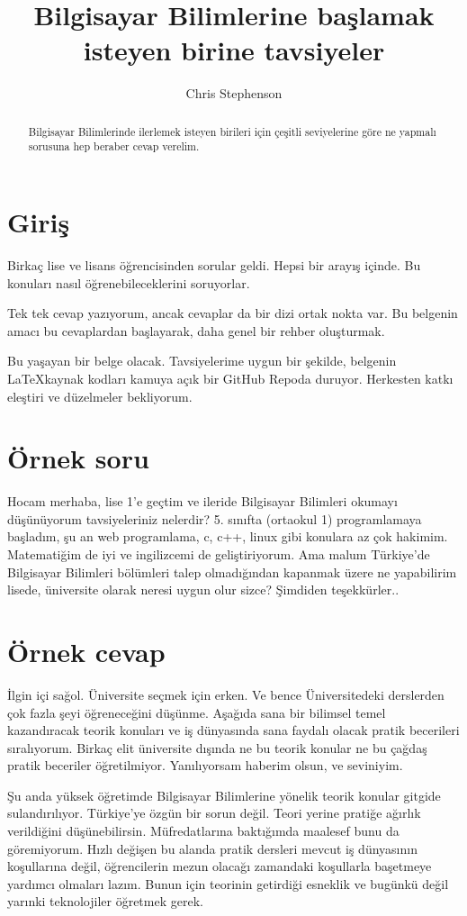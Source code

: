 \documentclass[a4paper,10pt]{article}
\title{Bilgisayar Bilimlerine başlamak isteyen birine tavsiyeler}
\author{Chris Stephenson}
\begin{document}
\maketitle

\begin{abstract}
Bilgisayar Bilimlerinde ilerlemek isteyen birileri için çeşitli seviyelerine göre ne yapmalı sorusuna hep beraber cevap verelim. 
\end{abstract}
\section*{Giriş}
Birkaç lise ve lisans öğrencisinden sorular geldi. Hepsi bir arayış içinde. Bu konuları nasıl öğrenebileceklerini soruyorlar.

Tek tek cevap yazıyorum, ancak cevaplar da bir dizi ortak nokta var. Bu belgenin amacı bu cevaplardan başlayarak, daha genel bir rehber oluşturmak.

Bu yaşayan bir belge olacak. Tavsiyelerime uygun bir şekilde, belgenin \LaTeX kaynak kodları kamuya açık bir GitHub Repoda duruyor. Herkesten katkı eleştiri ve düzelmeler bekliyorum.

\section*{Örnek soru}

Hocam merhaba, lise 1’e geçtim ve ileride Bilgisayar Bilimleri okumayı düşünüyorum tavsiyeleriniz nelerdir? 5. sınıfta (ortaokul 1) programlamaya başladım, şu an web programlama, c, c++, linux gibi konulara az çok hakimim. Matematiğim de iyi ve ingilizcemi de geliştiriyorum. Ama malum Türkiye’de Bilgisayar Bilimleri bölümleri talep olmadığından kapanmak üzere ne yapabilirim lisede, üniversite olarak neresi uygun olur sizce? Şimdiden teşekkürler.. 
 
\section*{Örnek cevap}
İlgin içi sağol. Üniversite seçmek için erken. Ve bence Üniversitedeki derslerden çok fazla şeyi öğreneceğini düşünme. Aşağıda sana bir bilimsel temel kazandıracak teorik konuları ve iş dünyasında sana faydalı olacak pratik becerileri sıralıyorum. Birkaç elit üniversite dışında ne bu teorik konular ne bu çağdaş pratik beceriler öğretilmiyor. Yanılıyorsam haberim olsun, ve seviniyim.
     
Şu anda yüksek öğretimde Bilgisayar Bilimlerine yönelik teorik konular gitgide sulandırılıyor. Türkiye'ye özgün bir sorun değil. Teori yerine pratiğe ağırlık verildiğini düşünebilirsin. Müfredatlarına baktığımda maalesef bunu da göremiyorum. Hızlı değişen bu alanda pratik dersleri mevcut iş dünyasının koşullarına değil, öğrencilerin mezun olacağı zamandaki koşullarla başetmeye yardımcı olmaları lazım. Bunun için teorinin getirdiği esneklik ve bugünkü değil yarınki teknolojiler öğretmek gerek. 
\end{document}
